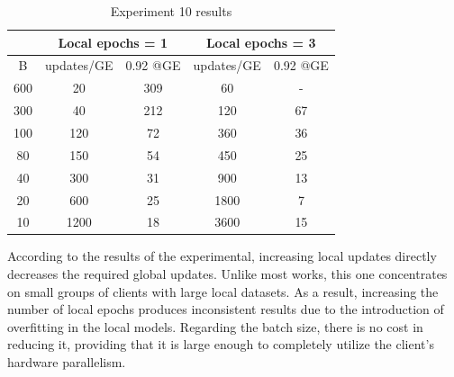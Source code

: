 \begin{table}[H]
    \center
    \begin{tabular}{ | c | c c | c c | }
        \hline
        & \multicolumn{2}{|c|}{Local epochs = 1} & \multicolumn{2}{|c|}{Local epochs = 3} \\\hline
        B & updates/GE &  0.92 @GE & updates/GE &  0.92 @GE\\\hline
        600 & 20 & 309 & 60 & -\\
        300 & 40 & 212 & 120 & 67\\
        100 & 120 & 72 & 360 & 36\\
        80 & 150 & 54 & 450 & 25\\
        40 & 300 & 31 & 900 & 13\\
        20 & 600 & 25 & 1800 & 7\\
        10 & 1200 & 18 & 3600 & 15\\\hline
    \end{tabular}
    \caption[Experiment 10 results]{Experiment 10 results}
\end{table}

According to the results of the experimental, increasing local updates directly decreases the required global updates. Unlike most works, this one concentrates on small groups of clients with large local datasets. As a result, increasing the number of local epochs produces inconsistent results due to the introduction of overfitting in the local models. Regarding the batch size, there is no cost in reducing it, providing that it is large enough to completely utilize the client's hardware parallelism.